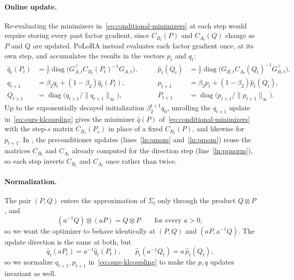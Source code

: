 \documentclass[11pt]{article}
\DeclareMathOperator{\diag}{diag}
\newcommand{\norm}[1]{\| #1\|}
\newcommand{\methodname}{PoLoRA\xspace}
\theoremstyle{plain}
\theoremstyle{definition}
\theoremstyle{remark}
\theoremstyle{definition}
\begin{document}
\paragraph{Online update.} Re-evaluating the minimizers
in~\eqref{eq:conditional-minimizers} at each step would require
storing every past factor gradient, since $C_{B_t}(P)$ and $C_{A_t}(Q)$ change
as $P$ and $Q$ are updated. \methodname{} instead evaluates each factor
gradient once, at its own step, and accumulates the results in the vectors
$p_t$ and $q_t$:
\begin{equation}\label{eq:ours-klcoupling}
\begin{alignedat}{2}
  \hat{q}_t(P_t)
    &= \frac1r\diag\bigl(G_{A,t}^\top C_{B_t}(P_t)^{-1}G_{A,t}\bigr),
  &\qquad
  \hat{p}_t(Q_t)
    &= \frac1r\diag\bigl(G_{B,t} C_{A_t}(Q_t)^{-1}G_{B,t}^\top\bigr),
  \\
  q_{t+1}
    &= \beta_2q_t+(1-\beta_2)\hat{q}_t(P_t),
  &\qquad
  p_{t+1}
    &= \beta_2p_t+(1-\beta_2)\hat{p}_t(Q_t),
  \\
  Q_{t+1}
    &= \diag\bigl(q_{t+1}/\norm{q_{t+1}}_\infty\bigr),
  &\qquad
  P_{t+1}
    &= \diag\bigl(p_{t+1}/\norm{p_{t+1}}_\infty\bigr).
\end{alignedat}
\end{equation}
Up to the exponentially decayed initialization $\beta_2^{t+1}q_0$, unrolling the
$q_{t+1}$ update in~\eqref{eq:ours-klcoupling} gives the
minimizer $\hat q(P)$ of~\eqref{eq:conditional-minimizers} with the
step-$s$ matrix $C_{B_s}(P_s)$ in place of a fixed $C_{B_t}(P)$, and likewise for $p_{t+1}$. In , the preconditioner updates (lines~\ref{ln:qmom}
and~\ref{ln:pmom}) reuse the matrices $C_{B_t}$ and $C_{A_t}$ already computed for the direction step (line~\ref{ln:pqnorm}), so each step inverts $C_{B_t}$ and $C_{A_t}$ once rather than twice.

\paragraph{Normalization.} The pair $(P, Q)$ enters the
approximation of $\overline \Sigma_t$ only through the product
$Q \otimes P$, and
\[
  (a^{-1}Q)\otimes(aP)=Q\otimes P
  \qquad\text{for every } a>0,
\]
so we want the optimizer to behave identically at $(P,Q)$ and
$(aP,a^{-1}Q)$. The update direction is the same at both, but
\[
  \hat q_t(aP_t)=a^{-1}\hat q_t(P_t),
  \qquad
  \hat p_t(a^{-1}Q_t)=a\,\hat p_t(Q_t),
\]
so we normalize $q_{t+1},p_{t+1}$ in~\eqref{eq:ours-klcoupling} to
make the $p,q$ updates invariant as well.
\end{document}
